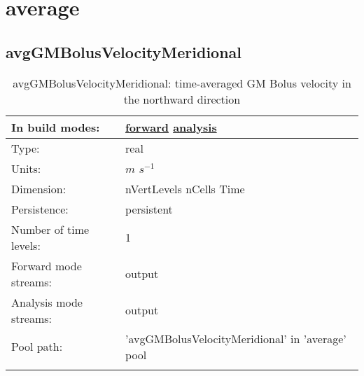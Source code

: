 \section[average]{average}
\label{sec:var_sec_average}
\subsection[avgGMBolusVelocityMeridional]{avgGMBolusVelocityMeridional}
\label{subsec:var_sec_average_avgGMBolusVelocityMeridional}
\begin{center}
\begin{longtable}{| p{2.0in} | p{4.0in} |}
        \hline 
        In build modes: & \hyperref[subsec:forward_var_tab_average]{forward} \hyperref[subsec:analysis_var_tab_average]{analysis} \\
        \hline 
        Type: & real \\
        \hline 
        Units: & $m$ $s^{-1}$ \\
        \hline 
        Dimension: & nVertLevels nCells Time \\
        \hline 
        Persistence: & persistent \\
        \hline 
        Number of time levels: & 1 \\
        \hline 
		 Forward mode streams: &  output \\
        \hline 
		 Analysis mode streams: &  output \\
        \hline 
            Pool path: & 'avgGMBolusVelocityMeridional' in 'average' pool
 \\
		 \hline 
    \caption{avgGMBolusVelocityMeridional: time-averaged GM Bolus velocity in the northward direction}
\end{longtable}
\end{center}
